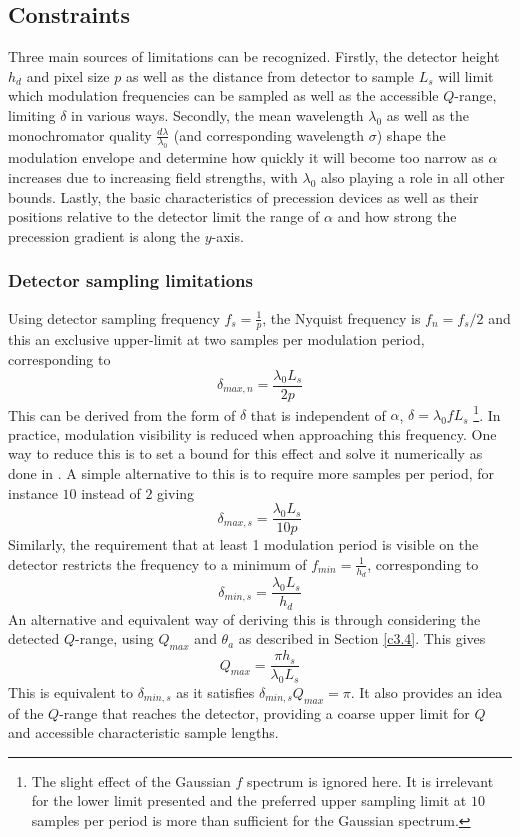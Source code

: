 \documentclass{article}
\begin{document}
\subsection{Constraints}
\label{c4.1}
Three main sources of limitations can be recognized. Firstly, the detector height $h_d$ and pixel size $p$ as well as the distance from detector to sample $L_s$ will limit which modulation frequencies can be sampled as well as the accessible $Q$-range, limiting $\delta$ in various ways.
Secondly, the mean wavelength $\lambda_0$ as well as the monochromator quality $\frac{d\lambda}{\lambda_0}$ (and corresponding wavelength $\sigma$) shape the modulation envelope and determine how quickly it will become too narrow as $\alpha$ increases due to increasing field strengths, with $\lambda_0$ also playing a role in all other bounds. Lastly, the basic characteristics of precession devices as well as their positions relative to the detector limit the range of $\alpha$ and how strong the precession gradient is along the $y$-axis. 
\subsubsection{Detector sampling limitations}
Using detector sampling frequency $f_s = \frac{1}{p}$, the Nyquist frequency is $f_n = f_s/2$ and this an exclusive upper-limit at two samples per modulation period, corresponding to 
$$\delta_{max,n} = \frac{\lambda_0L_s}{2p}$$
This can be derived from the form of $\delta$ that is independent of $\alpha$, $\delta = \lambda_0 fL_s$ \footnote{The slight effect of the Gaussian $f$ spectrum is ignored here. It is irrelevant for the lower limit presented and the preferred upper sampling limit at $10$ samples per period is more than sufficient for the Gaussian spectrum.}. In practice, modulation visibility is reduced when approaching this frequency. One way to reduce this is to set a bound for this effect and solve it numerically as done in \cite{kusmin2017}. A simple alternative to this is to require more samples per period, for instance $10$ instead of $2$ giving
$$\delta_{max,s} = \frac{\lambda_0L_s}{10p}$$
Similarly, the requirement that at least 1 modulation period is visible on the detector restricts the frequency to a minimum of $f_{min} = \frac{1}{h_d}$, corresponding to 
$$\delta_{min,s} = \frac{\lambda_0L_s}{h_d}$$
An alternative and equivalent way of deriving this is through considering the detected $Q$-range, using $Q_{max}$ and $\theta_a$ as described in Section \ref{c3.4}. This gives 
$$Q_{max} = \frac{\pi h_s}{\lambda_0 L_s}$$
This is equivalent to $\delta_{min,s}$ as it satisfies $\delta_{min,s} Q_{max} = \pi$. It also provides an idea of the $Q$-range that reaches the detector, providing a coarse upper limit for $Q$ and accessible characteristic sample lengths. 
\end{document}
